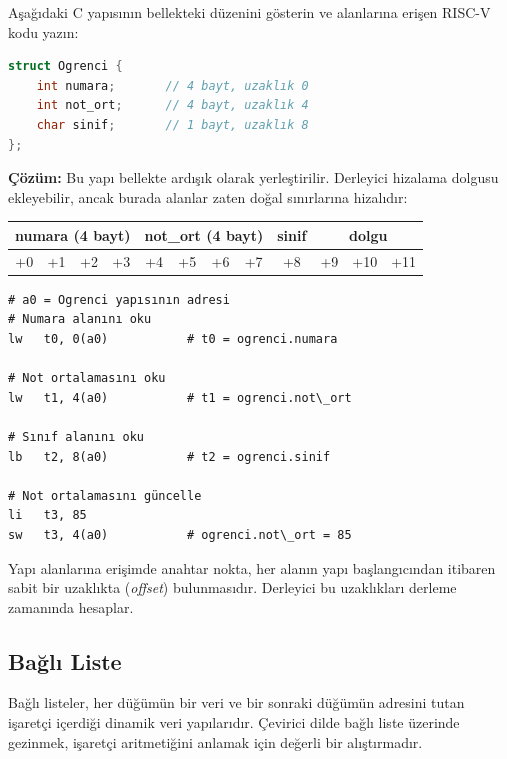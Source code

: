 \begin{ornek}[4.12]
\label{orn:struct}
Aşağıdaki C yapısının bellekteki düzenini gösterin ve alanlarına erişen RISC-V kodu yazın:

\begin{lstlisting}[language=C, style=alistirma-kod]
struct Ogrenci {
    int numara;       // 4 bayt, uzaklık 0
    int not_ort;      // 4 bayt, uzaklık 4
    char sinif;       // 1 bayt, uzaklık 8
};
\end{lstlisting}

\textbf{Çözüm:} Bu yapı bellekte ardışık olarak yerleştirilir. Derleyici hizalama dolgusu ekleyebilir, ancak burada alanlar zaten doğal sınırlarına hizalıdır:

\begin{center}
\small
\begin{tabular}{|c|c|c|c|c|c|c|c|c|c|c|c|}
\hline
\multicolumn{4}{|c|}{numara (4 bayt)} & \multicolumn{4}{c|}{not\_ort (4 bayt)} & sinif & \multicolumn{3}{c|}{dolgu} \\
\hline
+0 & +1 & +2 & +3 & +4 & +5 & +6 & +7 & +8 & +9 & +10 & +11 \\
\hline
\end{tabular}
\end{center}

\begin{lstlisting}[style=riscv]
# a0 = Ogrenci yapısının adresi
# Numara alanını oku
lw   t0, 0(a0)           # t0 = ogrenci.numara

# Not ortalamasını oku
lw   t1, 4(a0)           # t1 = ogrenci.not\_ort

# Sınıf alanını oku
lb   t2, 8(a0)           # t2 = ogrenci.sinif

# Not ortalamasını güncelle
li   t3, 85
sw   t3, 4(a0)           # ogrenci.not\_ort = 85
\end{lstlisting}

Yapı alanlarına erişimde anahtar nokta, her alanın yapı başlangıcından itibaren sabit bir uzaklıkta (\emph{offset}) bulunmasıdır. Derleyici bu uzaklıkları derleme zamanında hesaplar.
\end{ornek}


\subsection{Bağlı Liste}
\label{subsec:bagli-liste}

Bağlı listeler, her düğümün bir veri ve bir sonraki düğümün adresini tutan işaretçi içerdiği dinamik veri yapılarıdır. Çevirici dilde bağlı liste üzerinde gezinmek, işaretçi aritmetiğini anlamak için değerli bir alıştırmadır.

